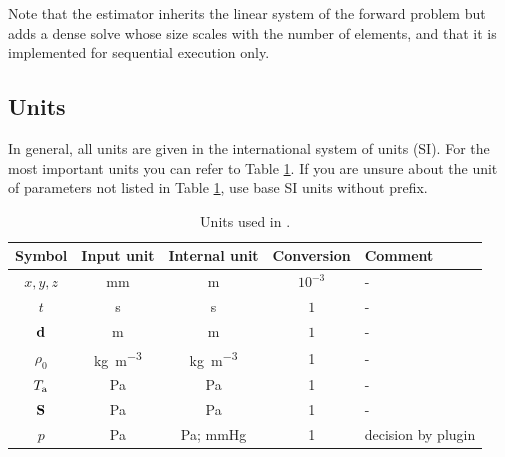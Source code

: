 Note that the estimator inherits the linear system of the forward problem but adds a dense solve whose size scales with the number of elements, and that it is implemented for sequential execution only.


\subsection{Units}

In general, all units are given in the international system of units (SI).
For the most important units you can refer to Table \ref{tab:units}.
If you are unsure about the unit of parameters not listed in Table \ref{tab:units}, use base SI units without prefix.

\begin{table}[h!]
    \centering
    \caption{Units used in \CM.}
    \label{tab:units}
    \begin{tabular}{ccccl}
        \toprule
        Symbol  & Input unit & Internal unit & Conversion & Comment \\
        \midrule
         $x,y,z$ & \si{mm} & \si{m} & $10^{-3}$ & -\\
         $t$ & \si{s} & \si{s} & $1$ & -\\
         $\d$ & \si{m} & \si{m} & $1$ & -\\
         $\rho_0$ & \si{\kilo\gram\per\meter\cubed} & \si{\kilo\gram\per\meter\cubed} & 1 & -\\
         $T_\mathrm{a}$ & \si{\pascal} & \si{\pascal} & 1 & -\\
         $\S$ & \si{\pascal} & \si{\pascal} & 1 & -\\
         $p$ & \si{\pascal} & \si{\pascal}; \si{mmHg} & 1 & decision by plugin\\
         \bottomrule
    \end{tabular}
\end{table}

